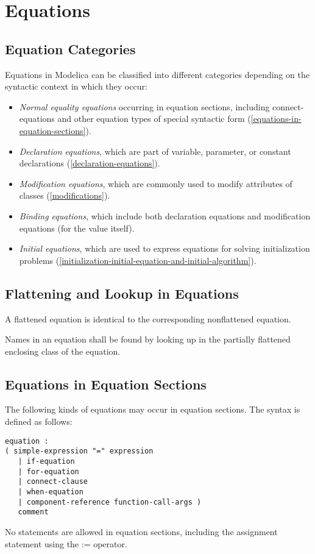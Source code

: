 \chapter{Equations}

\section{Equation Categories}

Equations in Modelica can be classified into different categories
depending on the syntactic context in which they occur:
\begin{itemize}
\item
  \emph{Normal equality equations} occurring in equation sections,
  including connect-equations and other equation types of special
  syntactic form (\autoref{equations-in-equation-sections}).
\item
  \emph{Declaration equations}, which are part of variable, parameter,
  or constant declarations (\autoref{declaration-equations}).
\item
  \emph{Modification equations}, which are commonly used to modify
  attributes of classes (\autoref{modifications}).
\item
  \emph{Binding equations}, which include both declaration equations and
  modification equations (for the value itself).
\item
  \emph{Initial equations}, which are used to express equations for
  solving initialization problems (\autoref{initialization-initial-equation-and-initial-algorithm}).
\end{itemize}

\section{Flattening and Lookup in Equations}

A flattened equation is identical to the corresponding nonflattened
equation.

Names in an equation shall be found by looking up in the partially
flattened enclosing class of the equation.

\section{Equations in Equation Sections}

The following kinds of equations may occur in equation sections. The
syntax is defined as follows:
\begin{lstlisting}[language=grammar]
equation :
( simple-expression "=" expression
   | if-equation
   | for-equation
   | connect-clause
   | when-equation
   | component-reference function-call-args )
   comment
\end{lstlisting}
No statements are allowed in equation sections, including the assignment
statement using the := operator.

